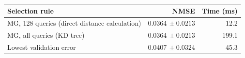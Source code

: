 \begin{tabularx}{\linewidth}{@{}>{\raggedright\arraybackslash}Xrr@{}}
\toprule
Selection rule & NMSE & Time (ms) \\
\midrule
MG, 128 queries (direct distance calculation) & $0.0364\,\pm 0.0213$ & 12.2 \\
MG, all queries (KD-tree) & $0.0364\,\pm 0.0213$ & 199.1 \\
Lowest validation error & $0.0407\,\pm 0.0324$ & 45.3 \\
\bottomrule
\end{tabularx}
